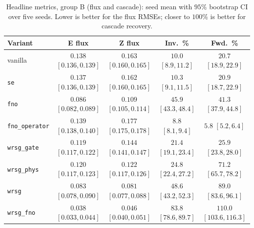 \documentclass[10pt]{article} %
\begin{document}
\begin{table}[H]
\centering
\caption{Headline metrics, group B (flux and cascade): seed mean with $95\%$ bootstrap CI over five seeds. Lower is better for the flux RMSEs; closer to $100\%$ is better for cascade recovery.}
\label{tab:ci-b}
\setlength{\tabcolsep}{4pt}
\begin{tabular}{lcccc}
\toprule
Variant & E flux & Z flux & Inv.\ \% & Fwd.\ \% \\
\midrule
vanilla & $0.138$ {\scriptsize$[0.136,0.139]$} & $0.163$ {\scriptsize$[0.160,0.165]$} & $10.0$ {\scriptsize$[8.9,11.2]$} & $20.7$ {\scriptsize$[18.9,22.9]$} \\
\texttt{se} & $0.137$ {\scriptsize$[0.136,0.139]$} & $0.162$ {\scriptsize$[0.160,0.165]$} & $10.3$ {\scriptsize$[9.1,11.5]$} & $20.9$ {\scriptsize$[18.7,22.9]$} \\
\texttt{fno} & $0.086$ {\scriptsize$[0.082,0.089]$} & $0.109$ {\scriptsize$[0.105,0.114]$} & $45.9$ {\scriptsize$[43.3,48.4]$} & $41.3$ {\scriptsize$[37.9,44.8]$} \\
\texttt{fno\_operator} & $0.139$ {\scriptsize$[0.138,0.140]$} & $0.177$ {\scriptsize$[0.175,0.178]$} & $8.8$ {\scriptsize$[8.1,9.4]$} & $5.8$ {\scriptsize$[5.2,6.4]$} \\
\texttt{wrsg\_gate} & $0.119$ {\scriptsize$[0.117,0.122]$} & $0.144$ {\scriptsize$[0.141,0.147]$} & $21.4$ {\scriptsize$[19.1,23.4]$} & $25.9$ {\scriptsize$[23.8,28.0]$} \\
\texttt{wrsg\_phys} & $0.120$ {\scriptsize$[0.117,0.123]$} & $0.122$ {\scriptsize$[0.117,0.126]$} & $24.8$ {\scriptsize$[22.4,27.2]$} & $71.2$ {\scriptsize$[65.7,78.2]$} \\
\texttt{wrsg} & $0.083$ {\scriptsize$[0.078,0.090]$} & $0.081$ {\scriptsize$[0.077,0.088]$} & $48.6$ {\scriptsize$[43.2,52.3]$} & $89.0$ {\scriptsize$[83.6,96.1]$} \\
\texttt{wrsg\_fno} & $0.038$ {\scriptsize$[0.033,0.044]$} & $0.046$ {\scriptsize$[0.040,0.051]$} & $83.8$ {\scriptsize$[78.6,89.7]$} & $110.0$ {\scriptsize$[103.6,116.3]$} \\
\bottomrule
\end{tabular}
\end{table}
\end{document}
